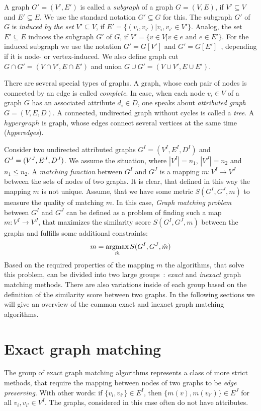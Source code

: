 A graph $G'=(V',E')$ is called a \emph{subgraph} of a graph $G=(V,E)$, if $V'\subseteq V$ and $E'\subseteq E$. We use the standard notation $G'\subseteq G$ for this. The subgraph $G'$ of $G$ is \emph{induced by the set $V'\subseteq V$}, if $E'=\{(v_i, v_{i'})|v_i,v_{i'}\in V'\}$. Analog, the set $E'\subseteq E$ induces the subgraph $G'$ of $G$, if $V'=\{v\in V|v\in e\text{ and }e\in E'\}$. For the induced subgraph we use the notation $G'=G[V']$ and $G'=G[E']$~\cite{Diestel2000}, depending if it is node- or vertex-induced. We also define graph cut $G\cap G'=(V\cap V', E\cap E')$ and union $G\cup G'=(V\cup V', E\cup E')$.

There are several special types of graphs. A graph, whose each pair of nodes is connected by an edge is called \emph{complete}. In case, when each node $v_i\in V$ of a graph $G$ has an associated attribute $d_i\in D$, one speaks about \emph{attributed graph} $G=(V,E,D)$. A connected, undirected graph without cycles is called a \emph{tree}. A $hypergraph$ is graph, whose edges connect several vertices at the same time (\emph{hyperedges}).

Consider two undirected attributed graphs $G^I = (V^I, E^I, D^I)$ and $G^J = (V^J, E^J,\newline D^J)$. We assume the situation, where $|V^I|=n_1$, $|V^J|=n_2$ and $n_1\le n_2$. A \emph{matching function} between $G^I$ and $G^J$ is a mapping $m:V^I\rightarrow V^J$ between the sets of nodes of two graphs.
It is clear, that defined in this way the mapping $m$ is not unique. Assume, that we have some metric $S(G^I, G^J, m)$ to measure the quality of matching $m$. In this case, \emph{Graph matching problem} between $G^I$ and $G^J$ can be defined as a problem of finding such a map $m:V^I\rightarrow V^J$, that maximizes the similarity score $S(G^I, G^J, m)$ between the graphs and fulfills some additional constraints:
\begin{equation} \label{gGMP}
m = \mathop{\rm argmax}_{\hat{m}}S(G^I, G^J, \hat{m})
\end{equation}
Based on the required properties of the mapping $m$ the algorithms, that solve this problem, can be divided into two large groups~\cite{Conte2004}: \emph{exact} and \emph{inexact} graph matching methods. There are also variations inside of each group based on the definition of the similarity score between two graphs. In the following sections we will give an overview of the common exact and inexact graph matching algorithms.
 
\section{Exact graph matching}
The group of exact graph matching algorithms represents a class of more strict methods, that require the mapping between nodes of two graphs to be \emph{edge preserving}. With other words: if $\{v_i,v_{i'}\}\in E^I$, then $\{m(v),m(v_{i'})\}\in E^J$ for all $v_i,v_{i'}\in V^I$. The graphs, considered in this case often do not have attributes.

